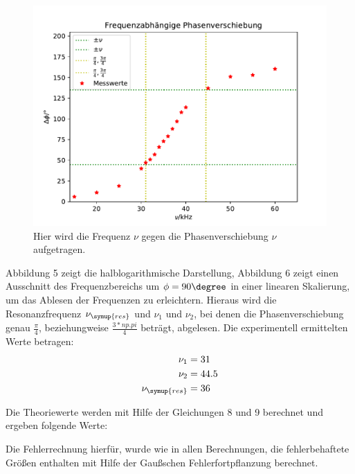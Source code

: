 \begin{figure}
  \centering
  \includegraphics[scale = 0.7]{plotD2.pdf}
  \caption{Hier wird die Frequenz $\nu$ gegen die Phasenverschiebung $\nu$ aufgetragen.}
  \label{Abb:6}
 \end{figure}


 Abbildung  5 zeigt die halblogarithmische Darstellung, Abbildung 6 zeigt einen Ausschnitt des Frequenzbereichs um
 $\phi = 90 \degree$ in einer linearen Skalierung, um das Ablesen der Frequenzen zu erleichtern. Hieraus wird die
 Resonanzfrequenz $\nu_\symup{res}$ und $\nu_1$ und $\nu_2$, bei denen die Phasenverschiebung genau $\frac{\pi}{4}$,
 beziehungweise $\frac{3*np.pi}{4}$ beträgt, abgelesen.
 Die experimentell ermittelten Werte betragen:
 \begin{align*}
   \nu_1           &= 31 \\
   \nu_2           &= 44.5 \\
   \nu_\symup{res} &= 36
 \end{align*}

 Die Theoriewerte werden mit Hilfe der Gleichungen 8 und 9 berechnet und ergeben folgende Werte:

 Die Fehlerrechnung hierfür, wurde wie in allen Berechnungen, die fehlerbehaftete Größen enthalten mit Hilfe der Gaußschen
 Fehlerfortpflanzung berechnet.

